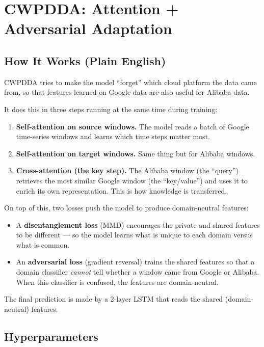 \documentclass[12pt,a4paper]{article}
\begin{document}
\section{\textcolor{cwpcolor}{CWPDDA}: Attention + Adversarial Adaptation}
\label{sec:cwpdda}

\subsection{How It Works (Plain English)}

CWPDDA tries to make the model ``forget'' which cloud platform the data came
from, so that features learned on Google data are also useful for Alibaba data.

It does this in three steps running at the same time during training:

\begin{enumerate}[leftmargin=*]
  \item \textbf{Self-attention on source windows.} The model reads a batch of
        Google time-series windows and learns which time steps matter most.
  \item \textbf{Self-attention on target windows.} Same thing but for Alibaba
        windows.
  \item \textbf{Cross-attention (the key step).} The Alibaba window
        (the ``query'') retrieves the most similar Google window (the
        ``key/value'') and uses it to enrich its own representation. This is
        how knowledge is transferred.
\end{enumerate}

On top of this, two losses push the model to produce domain-neutral features:
\begin{itemize}
  \item A \textbf{disentanglement loss} (MMD) encourages the private and shared
        features to be different --- so the model learns what is unique to each
        domain versus what is common.
  \item An \textbf{adversarial loss} (gradient reversal) trains the shared
        features so that a domain classifier \emph{cannot} tell whether a window
        came from Google or Alibaba. When this classifier is confused, the
        features are domain-neutral.
\end{itemize}

The final prediction is made by a 2-layer LSTM that reads the shared
(domain-neutral) features.

\subsection{Hyperparameters}
\end{document}
